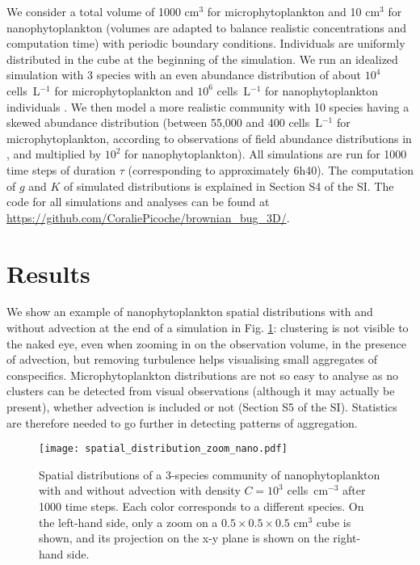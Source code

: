 \documentclass[12pt,english]{article}
\begin{document}
\medskip{}

We consider a total volume of 1000 cm$^{3}$ for microphytoplankton
and 10 cm$^{3}$ for nanophytoplankton (volumes are adapted to balance
realistic concentrations and computation time) with periodic boundary
conditions. Individuals are uniformly distributed in the cube at the
beginning of the simulation. We run an idealized simulation with 3
species with an even abundance distribution of about $10^{4}$ cells~L$^{-1}$
for microphytoplankton \citep{picoche_strong_2020} and $10^{6}$
cells~L$^{-1}$ for nanophytoplankton individuals \citep{edwards_mixotrophy_2019}.
We then model a more realistic community with 10 species having a
skewed abundance distribution (between 55,000 and 400 cells~L$^{-1}$
for microphytoplankton, according to observations of field abundance
distributions in \citealp{picoche_strong_2020}, and multiplied by
$10^{2}$ for nanophytoplankton). All simulations are run for 1000
time steps of duration $\tau$ (corresponding to approximately 6h40).
The computation of $g$ and $K$ of simulated distributions is explained
in Section S4 of the SI. The code for all simulations and analyses
can be found at \url{https://github.com/CoraliePicoche/brownian_bug_3D/}.

\section*{Results}

We show an example of nanophytoplankton spatial distributions with
and without advection at the end of a simulation in Fig. \ref{fig:Spatial-distributions}:
clustering is not visible to the naked eye, even when zooming in on
the observation volume, in the presence of advection, but removing
turbulence helps visualising small aggregates of conspecifics. Microphytoplankton
distributions are not so easy to analyse as no clusters can be detected
from visual observations (although it may actually be present), whether
advection is included or not (Section S5 of the SI). Statistics are
therefore needed to go further in detecting patterns of aggregation.

\begin{figure}[H]
\begin{centering}
\texttt{[image: spatial\_distribution\_zoom\_nano.pdf]} 
\par\end{centering}
\caption{Spatial distributions of a 3-species community of nanophytoplankton
with and without advection with density $C=10^{3}$ cells~cm$^{-3}$
after 1000 time steps. Each color corresponds to a different species.
On the left-hand side, only a zoom on a $0.5\times0.5\times0.5$ cm$^{3}$
cube is shown, and its projection on the x-y plane is shown on the
right-hand side. \label{fig:Spatial-distributions}}
\end{figure}
\end{document}
